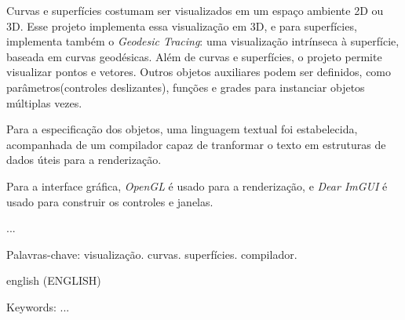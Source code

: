 \setlength{\absparsep}{18pt} 
\begin{resumo}[Resumo]
Curvas e superfícies costumam ser visualizados em um espaço ambiente 2D ou 3D.
Esse projeto implementa essa visualização em 3D, e para superfícies,
implementa também o \textit{Geodesic Tracing}: uma visualização intrínseca à
superfície, baseada em curvas geodésicas. Além de curvas e superfícies,
o projeto permite visualizar pontos e vetores. Outros objetos auxiliares podem ser
definidos, como parâmetros(controles deslizantes), funções e grades para
instanciar objetos múltiplas vezes.

Para a especificação dos objetos, uma linguagem textual foi estabelecida,
acompanhada de um compilador capaz de tranformar o texto em estruturas de dados
úteis para a renderização.

Para a interface gráfica, \textit{OpenGL} é usado para a renderização,
e \textit{Dear ImGUI} é usado para construir os controles e janelas.

...

 Palavras-chave: visualização. curvas. superfícies. compilador.
\end{resumo}

\begin{resumo}[Abstract]
 \begin{otherlanguage*}{english}
  (ENGLISH)
 \end{otherlanguage*}

 Keywords: ...
\end{resumo}